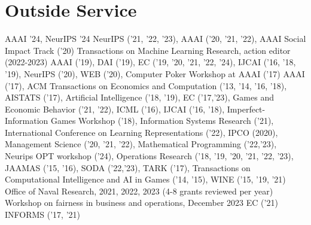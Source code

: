 \documentclass[11pt,a4paper,sans]{moderncv}        %
\begin{document}

\section{Outside Service}
{
  AAAI '24,
  NeurIPS '24
}
{
  NeurIPS ('21, '22, '23),
  AAAI ('20, '21, '22),
  AAAI Social Impact Track ('20)
}
{
  Transactions on Machine Learning Research, action editor (2022-2023)
}
{
  AAAI ('19),
  DAI ('19),
  EC ('19, '20, '21, '22, '24),
  IJCAI ('16, '18, '19),
  NeurIPS ('20),
  WEB ('20),
  Computer Poker Workshop at AAAI ('17)
}
{
  AAAI ('17),
  ACM Transactions on Economics and Computation ('13, '14, '16, '18),
  AISTATS ('17),
  Artificial Intelligence ('18, '19),
  EC ('17,'23),
  Games and Economic Behavior ('21, '22),
  ICML ('16),
  IJCAI ('16, '18),
  Imperfect-Information Games Workshop ('18),
  Information Systems Research ('21),
  International Conference on Learning Representations ('22),
  IPCO (2020),
  Management Science ('20, '21, '22),
  Mathematical Programming ('22,'23),
  Neurips OPT workshop ('24),
  Operations Research ('18, '19, '20, '21, '22, '23),
  JAAMAS ('15, '16),
  SODA ('22,'23),
  TARK ('17),
  Transactions on Computational Intelligence and AI in Games ('14, '15),
  WINE ('15, '19, '21)
}
{
  Office of Naval Research, 2021, 2022, 2023 (4-8 grants reviewed per year)
}
{
  Workshop on fairness in business and operations, December 2023
}
{
  EC ('21)
  INFORMS ('17, '21)
}
\end{document}
